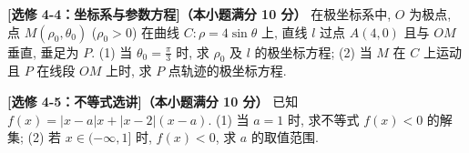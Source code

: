 \begin{question}
\textbf{[选修 4-4：坐标系与参数方程]（本小题满分 10 分）} 
在极坐标系中, $O$ 为极点, 点 $M(\rho_0, \theta_0)$ ($\rho_0 > 0$) 在曲线 $C: \rho = 4\sin\theta$ 上, 直线 $l$ 过点 $A(4, 0)$ 且与 $OM$ 垂直, 垂足为 $P$.
(1) 当 $\theta_0 = \frac{\pi}{3}$ 时, 求 $\rho_0$ 及 $l$ 的极坐标方程;
(2) 当 $M$ 在 $C$ 上运动且 $P$ 在线段 $OM$ 上时, 求 $P$ 点轨迹的极坐标方程.

\end{question}
\begin{question}
\textbf{[选修 4-5：不等式选讲]（本小题满分 10 分）} 
已知 $f(x) = |x - a|x + |x - 2|(x - a)$.
(1) 当 $a = 1$ 时, 求不等式 $f(x) < 0$ 的解集;
(2) 若 $x \in (-\infty, 1]$ 时, $f(x) < 0$, 求 $a$ 的取值范围.

\end{question}